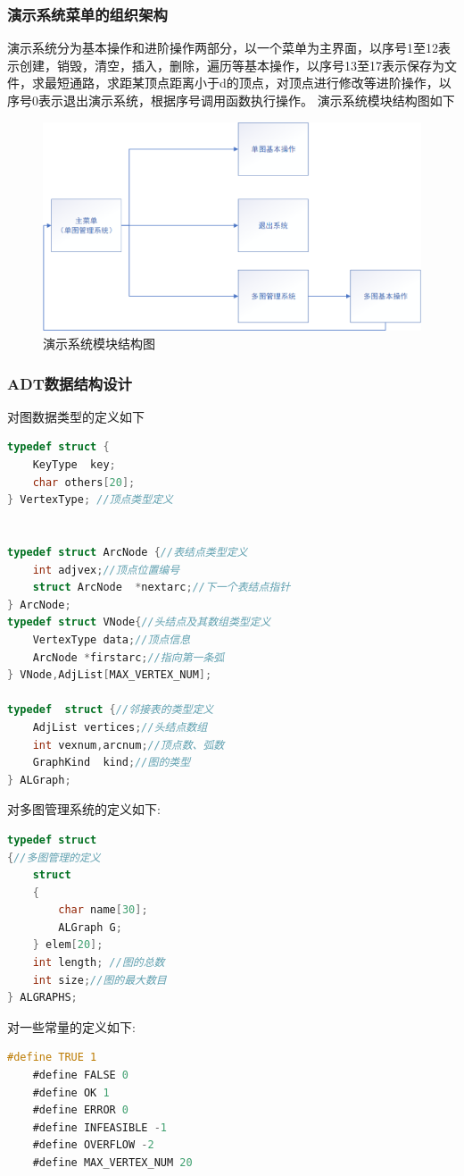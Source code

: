 \documentclass[supercite]{Experimental_Report}
\theoremstyle{definition}
\begin{document}
\subsubsection{演示系统菜单的组织架构}
\quad 演示系统分为基本操作和进阶操作两部分，以一个菜单为主界面，以序号1至12表示创建，销毁，清空，插入，删除，遍历等基本操作，以序号13至17表示保存为文件，求最短通路，求距某顶点距离小于d的顶点，对顶点进行修改等进阶操作，以序号0表示退出演示系统，根据序号调用函数执行操作。
演示系统模块结构图如下
\begin{figure}[H] %
	\begin{center}
		\includegraphics[width=1\linewidth]{images/2.3.png}
		\caption{演示系统模块结构图}
	\end{center}
\end{figure}
\subsubsection{ADT数据结构设计}
\noindent 对图数据类型的定义如下\par
\begin{lstlisting}[language=C] 
typedef struct {
	KeyType  key;
	char others[20];
} VertexType; //顶点类型定义


typedef struct ArcNode {//表结点类型定义
	int adjvex;//顶点位置编号 
	struct ArcNode  *nextarc;//下一个表结点指针
} ArcNode;
typedef struct VNode{//头结点及其数组类型定义
	VertexType data;//顶点信息
	ArcNode *firstarc;//指向第一条弧
} VNode,AdjList[MAX_VERTEX_NUM];

typedef  struct {//邻接表的类型定义
	AdjList vertices;//头结点数组
	int vexnum,arcnum;//顶点数、弧数
	GraphKind  kind;//图的类型
} ALGraph;
\end{lstlisting}
对多图管理系统的定义如下:
\begin{lstlisting}[language=C] 
typedef struct 
{//多图管理的定义 
	struct
	{
		char name[30];
		ALGraph G;
	} elem[20];
	int length; //图的总数 
	int size;//图的最大数目 
} ALGRAPHS; 
\end{lstlisting}
对一些常量的定义如下:
\begin{lstlisting}[language=C] 
	#define TRUE 1
	#define FALSE 0
	#define OK 1
	#define ERROR 0
	#define INFEASIBLE -1
	#define OVERFLOW -2
	#define MAX_VERTEX_NUM 20
\end{lstlisting}
\end{document}

